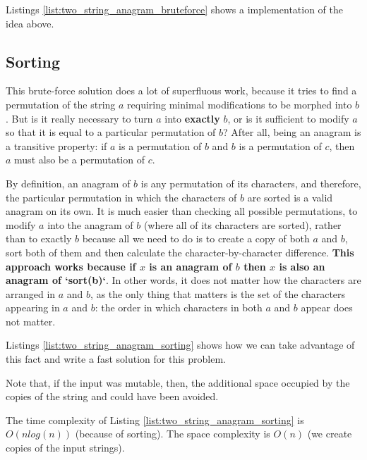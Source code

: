 Listings \ref{list:two_string_anagram_bruteforce} shows a \CC implementation of the idea above.




\subsection{Sorting}
\label{sec:anagrams:sorting}
This brute-force solution does a lot of superfluous work, because it tries to find a permutation of the string $a$ requiring minimal modifications to be morphed into $b$.
But is it really necessary to turn $a$ into \textbf{exactly} $b$, or is it sufficient to modify $a$ so that it is equal to a particular permutation of $b$? 
After all, being an anagram is a transitive property: if $a$ is a permutation of $b$ and $b$ is a permutation of $c$, then $a$ must also be a permutation of $c$. 

By definition, an anagram of $b$ is any permutation of its characters, and therefore, the particular permutation in which the characters of $b$ are sorted is a valid anagram on its own. 
It is much easier than checking all possible permutations, to modify $a$ into the  anagram of $b$ (where all of its characters are sorted), rather than to exactly $b$ because all we need to do is to create a copy of both $a$ and $b$, sort both of them and then calculate the character-by-character difference.
\textbf{This approach works because if $x$ is an anagram of $b$ then $x$ is also an
anagram of `sort(b)`}.
In other words, it does not matter how the characters are arranged in $a$ and $b$, as the only thing that matters is the set of the characters
appearing in $a$ and $b$: the order in which characters in both $a$ and $b$ appear does not matter. 

Listings \ref{list:two_string_anagram_sorting}  shows how we can take advantage of this fact and write a fast solution for this problem.



Note that, if the input was mutable, then, the additional space occupied by the copies of the string  and  could have been avoided. 

The time complexity of Listing \ref{list:two_string_anagram_sorting}  is $O(n log(n))$ (because of sorting). The space complexity is $O(n)$ (we create copies of the input strings).



